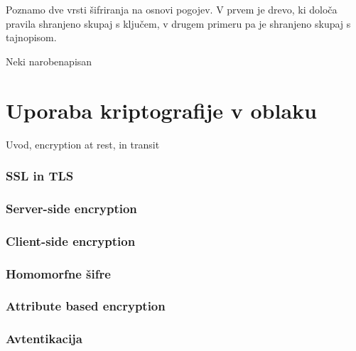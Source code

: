 \documentclass[12pt,a4paper,openany]{book}
\begin{document}
Poznamo dve vrsti šifriranja na osnovi pogojev. V prvem je drevo, ki določa pravila shranjeno skupaj s ključem, v drugem primeru pa je shranjeno skupaj s tajnopisom.

Neki narobenapisan


\chapter{Uporaba kriptografije v oblaku}

Uvod, encryption at rest, in transit

\subsection{SSL in TLS}

\subsection{Server-side encryption}

\subsection{Client-side encryption}

\subsection{Homomorfne šifre}

\subsection{Attribute based encryption}

\subsection{Avtentikacija}




\newpage


\listoffigures

\newpage

\listoftables




\newpage


\label{stran_literatura}

\end{document}
